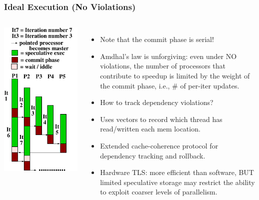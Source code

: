 \documentclass{beamer}
\newcommand{\emp}[1]{\textcolor{DikuRed}{ #1}}
\begin{document}
\begin{frame}[fragile,t]
  \frametitle{Ideal Execution (No Violations)}

\begin{columns}
\includegraphics[width=22ex]{FigsTLS/IdealCommit.pdf}\pause
{}
\begin{itemize}
\item Note that the commit phase is serial!
\item Amdhal's law is unforgiving: even under 
        NO violations, the number of processors 
        that contribute
        to speedup is limited by the weight
        of the commit phase, i.e., \#
        of per-iter updates.\medskip

\item \emp{How to track dependency violations?}
\item Uses vectors to record which thread has
        read/written each mem location.
\item Extended cache-coherence protocol for
        dependency tracking and rollback.
\item Hardware TLS: more efficient than software, BUT
        limited speculative storage may restrict the ability
        to exploit coarser levels of parallelism. 
\end{itemize}
\end{columns}

\end{frame}
\end{document}
